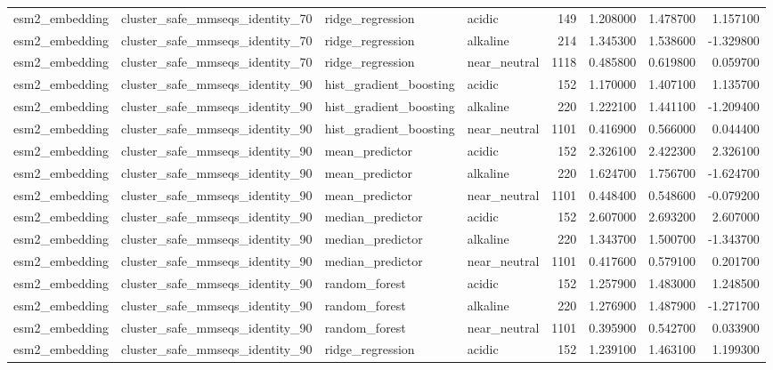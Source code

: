 \begin{longtable}{llllrrrr}
esm2\_embedding & cluster\_safe\_mmseqs\_identity\_70 & ridge\_regression & acidic & 149 & 1.208000 & 1.478700 & 1.157100 \\
esm2\_embedding & cluster\_safe\_mmseqs\_identity\_70 & ridge\_regression & alkaline & 214 & 1.345300 & 1.538600 & -1.329800 \\
esm2\_embedding & cluster\_safe\_mmseqs\_identity\_70 & ridge\_regression & near\_neutral & 1118 & 0.485800 & 0.619800 & 0.059700 \\
esm2\_embedding & cluster\_safe\_mmseqs\_identity\_90 & hist\_gradient\_boosting & acidic & 152 & 1.170000 & 1.407100 & 1.135700 \\
esm2\_embedding & cluster\_safe\_mmseqs\_identity\_90 & hist\_gradient\_boosting & alkaline & 220 & 1.222100 & 1.441100 & -1.209400 \\
esm2\_embedding & cluster\_safe\_mmseqs\_identity\_90 & hist\_gradient\_boosting & near\_neutral & 1101 & 0.416900 & 0.566000 & 0.044400 \\
esm2\_embedding & cluster\_safe\_mmseqs\_identity\_90 & mean\_predictor & acidic & 152 & 2.326100 & 2.422300 & 2.326100 \\
esm2\_embedding & cluster\_safe\_mmseqs\_identity\_90 & mean\_predictor & alkaline & 220 & 1.624700 & 1.756700 & -1.624700 \\
esm2\_embedding & cluster\_safe\_mmseqs\_identity\_90 & mean\_predictor & near\_neutral & 1101 & 0.448400 & 0.548600 & -0.079200 \\
esm2\_embedding & cluster\_safe\_mmseqs\_identity\_90 & median\_predictor & acidic & 152 & 2.607000 & 2.693200 & 2.607000 \\
esm2\_embedding & cluster\_safe\_mmseqs\_identity\_90 & median\_predictor & alkaline & 220 & 1.343700 & 1.500700 & -1.343700 \\
esm2\_embedding & cluster\_safe\_mmseqs\_identity\_90 & median\_predictor & near\_neutral & 1101 & 0.417600 & 0.579100 & 0.201700 \\
esm2\_embedding & cluster\_safe\_mmseqs\_identity\_90 & random\_forest & acidic & 152 & 1.257900 & 1.483000 & 1.248500 \\
esm2\_embedding & cluster\_safe\_mmseqs\_identity\_90 & random\_forest & alkaline & 220 & 1.276900 & 1.487900 & -1.271700 \\
esm2\_embedding & cluster\_safe\_mmseqs\_identity\_90 & random\_forest & near\_neutral & 1101 & 0.395900 & 0.542700 & 0.033900 \\
esm2\_embedding & cluster\_safe\_mmseqs\_identity\_90 & ridge\_regression & acidic & 152 & 1.239100 & 1.463100 & 1.199300 \\

\end{longtable}
